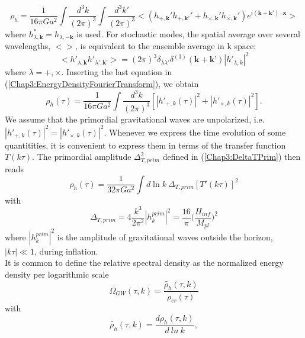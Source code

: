 \documentclass[11pt,a4paper,twoside]{book}
\begin{document}
\begin{equation}
\label{Chap3:EnergyDensityFourierTransform}
\rho_{h}=	\frac{1}{16\pi G a^{2}} \int \frac{d^{3}k}{(2\pi)^{3}}\int \frac{d^{3}k'}{(2\pi)^{3}} <(h_{+,\textbf{k}}'h_{+,\textbf{k}'}' + h_{\times,\textbf{k}}'h_{\times,\textbf{k}}')e^{i(\textbf{k} + \textbf{k}') \cdot \textbf{x}} >
\end{equation}
where $ h^{*}_{\lambda,\textbf{k}}=h_{\lambda,-\textbf{k}} $ is used. For stochastic modes, the spatial average over several wavelengths, $ < > $, is equivalent to the ensemble average in k space:
\begin{equation}
	\label{Chap3:ensembleAverage}
	<h'_{\lambda,\textbf{k}}h'_{\lambda',\textbf{k'}}>=(2\pi)^{3}\delta_{\lambda\lambda'}\delta^{(3)}(\textbf{k}+\textbf{k'})|h'_{\lambda,k}|^{2}
\end{equation}
where $\lambda = +,\times$. Inserting the last equation in (\ref{Chap3:EnergyDensityFourierTransform}), we obtain
\begin{equation}
	\rho_{h}(\tau)=\frac{1}{16\pi G a^{2}} \int \frac{d^{3} k}{(2\pi)^{3}}[|h'_{+,k}(\tau)|^{2} + |h'_{\times,k}(\tau)|^{2}].
\end{equation}
We assume that the primordial gravitational waves are unpolarized, i.e. $ |h'_{+,k}(\tau)|^{2} = |h'_{\times,k}(\tau)|^{2} $. Whenever we express the time evolution of some quantitities, it is convenient to express them in terms of the transfer function $T(k\tau)$.  The primordial amplitude $\Delta_{T,prim}^{2}$ defined in (\ref{Chap3:DeltaTPrim}) then reads
\begin{equation}
	\label{Chap3:EnergydensityTransferFunction}
	\rho_{h}(\tau)=\frac{1}{32\pi Ga^{2}}\int d\ln k\ \Delta_{T,prim}[T'(k\tau)]^{2}
\end{equation}
with 
\begin{equation}
	\label{Chap3:deltah2}
	\Delta_{T,prim}=4\frac{k^{3}}{2\pi^{2}}|h^{prim}_{k}|^{2}=\frac{16}{\pi}\Big(\frac{H_{inf}}{M_{pl}}\Big)^{2}
\end{equation}
where $|h^{prim}_{k}|^{2}  $ is the amplitude of gravitational waves outside the horizon, $ |k\tau| \ll 1 $, during inflation. \\
It is common to define the relative spectral density as the normalized energy density per logarithmic scale
\begin{equation}
	\label{Chap3:relativeSpectralDensity}
	\Omega_{GW}(\tau,k) = \frac{\tilde{\rho_{h}}(\tau,k)}{\rho_{cr}(\tau)}
\end{equation}
with
\begin{equation}
	\label{Chap3:rhoTilde}
	\tilde{\rho_{h}}(\tau,k)=\frac{d \rho_{h}(\tau,k)}{d\ ln\ k},
\end{equation}
\end{document}
